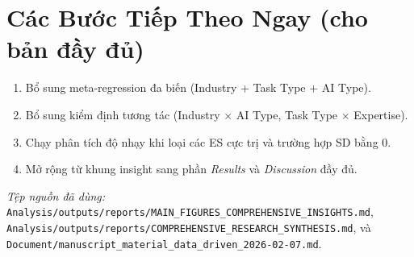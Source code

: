 \section*{Các Bước Tiếp Theo Ngay (cho bản đầy đủ)}
\begin{enumerate}[leftmargin=1.4em]
  \item Bổ sung meta-regression đa biến (Industry + Task Type + AI Type).
  \item Bổ sung kiểm định tương tác (Industry \(\times\) AI Type, Task Type \(\times\) Expertise).
  \item Chạy phân tích độ nhạy khi loại các ES cực trị và trường hợp SD bằng 0.
  \item Mở rộng từ khung insight sang phần \textit{Results} và \textit{Discussion} đầy đủ.
\end{enumerate}

\vspace{0.6em}
\noindent\textit{Tệp nguồn đã dùng:} \texttt{Analysis/outputs/reports/MAIN\_FIGURES\_COMPREHENSIVE\_INSIGHTS.md}, \texttt{Analysis/outputs/reports/COMPREHENSIVE\_RESEARCH\_SYNTHESIS.md}, và \texttt{Document/manuscript\_material\_data\_driven\_2026-02-07.md}.
